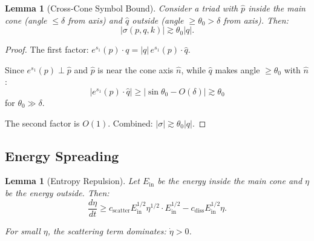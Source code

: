 \documentclass[11pt]{article}
\newtheorem{lemma}[theorem]{Lemma}
\theoremstyle{definition}
\begin{document}
\begin{lemma}[Cross-Cone Symbol Bound]\label{lem:cross-cone}
Consider a triad with $\hat{p}$ inside the main cone (angle $\leq \delta$ from axis) and $\hat{q}$ outside (angle $\geq \theta_0 > \delta$ from axis). Then:
\begin{equation}
|\sigma(p,q,k)| \gtrsim \theta_0 |q|.
\end{equation}
\end{lemma}

\begin{proof}
The first factor: $e^{s_1}(p) \cdot q = |q| \, e^{s_1}(p) \cdot \hat{q}$.

Since $e^{s_1}(p) \perp \hat{p}$ and $\hat{p}$ is near the cone axis $\hat{n}$, while $\hat{q}$ makes angle $\geq \theta_0$ with $\hat{n}$:
\begin{equation}
|e^{s_1}(p) \cdot \hat{q}| \geq |\sin\theta_0 - O(\delta)| \gtrsim \theta_0
\end{equation}
for $\theta_0 \gg \delta$.

The second factor is $O(1)$. Combined: $|\sigma| \gtrsim \theta_0 |q|$.
\end{proof}

\subsection{Energy Spreading}

\begin{lemma}[Entropy Repulsion]\label{lem:entropy}
Let $E_{\text{in}}$ be the energy inside the main cone and $\eta$ be the energy outside. Then:
\begin{equation}
\frac{d\eta}{dt} \geq c_{\text{scatter}} E_{\text{in}}^{1/2} \eta^{1/2} \cdot E_{\text{in}}^{1/2} - c_{\text{diss}} E_{\text{in}}^{1/2} \eta.
\end{equation}

For small $\eta$, the scattering term dominates: $\dot{\eta} > 0$.
\end{lemma}
\end{document}
